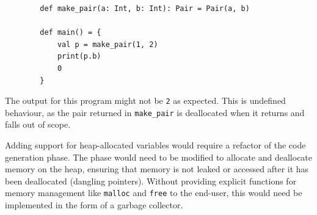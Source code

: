 \begin{tcolorbox}
    \begin{verbatim}
        def make_pair(a: Int, b: Int): Pair = Pair(a, b)

        def main() = {
            val p = make_pair(1, 2)
            print(p.b)
            0
        }
    \end{verbatim}
    \tcblower
    \footnotesize
    The output for this program might not be \texttt{2} as expected. This is undefined behaviour, as
    the pair returned in \texttt{make\_pair} is deallocated when it returns and falls out of scope.
\end{tcolorbox}

Adding support for heap-allocated variables would require a refactor of the code generation phase.
The phase would need to be modified to allocate and deallocate memory on the heap, ensuring that
memory is not leaked or accessed after it has been deallocated (dangling pointers). Without
providing explicit functions for memory management like \texttt{malloc} and \texttt{free} to the
end-user, this would need be implemented in the form of a garbage collector.


